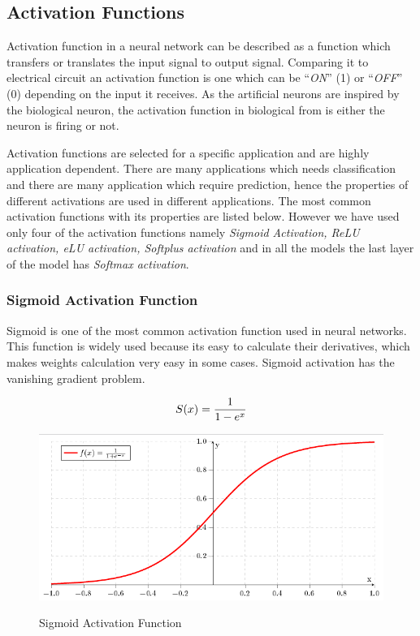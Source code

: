 \documentclass[12pt, a4paper]{report}
\begin{document}
\clearpage

\subsection{Activation Functions}\label{activationfunction}
Activation function in a neural network can be described as a function which transfers or translates the input signal to output signal. Comparing it to electrical circuit an activation function is one which can be ``\textit{ON}'' (1) or ``\textit{OFF}'' (0) depending on the input it receives. As the artificial neurons are inspired by the biological neuron, the activation function in biological from is either the neuron is firing or not.\\ \par

Activation functions are selected for a specific application and are highly application dependent. There are many applications which needs classification and there are many application which require prediction, hence the properties of different activations are used in different applications. The most common activation functions with its properties are listed below. However we have used only four of the activation functions namely \textit{Sigmoid Activation, ReLU activation, eLU activation, Softplus activation} and in all the models the last layer of the model has \textit{Softmax activation}.\\ \par

\subsubsection{Sigmoid Activation Function}\label{sec:sigmoid}
Sigmoid is one of the most common activation function used in neural networks. This function is widely used because its easy to calculate their derivatives, which makes weights calculation very easy in some cases. Sigmoid activation has the vanishing gradient problem.\\ \par
\begin{equation}
S(x) = \frac{1}{1-e^{x}} \\
\label{eq:sig}
\end{equation}

\begin{figure}[h]
\centering	
\includegraphics[width=12cm]{sigmoid.png}\\
\caption{Sigmoid Activation Function}
\label{fig:sigmoid}
\end{figure} 	
\clearpage
\end{document}
